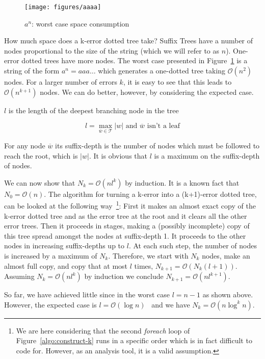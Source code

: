 \begin{figure}
\centering
\texttt{[image: figures/aaaa]}
\caption{$a^n$: worst case space consumption}%
\label{fig:aaaa}
\end{figure}

How much space does a k-error dotted tree take? Suffix Trees have a number of nodes proportional to the size of the string (which we will refer to as $n$). One-error dotted trees have more nodes. The worst case presented in Figure~\ref{fig:aaaa} is a string of the form $a^n = aaa\dots$ which generates a one-dotted tree taking $\mathcal{O}(n^2)$ nodes. For a larger number of errors $k$, it is easy to see that this leads to $\mathcal{O}(n^{k+1})$ nodes. We can do better, however, by considering the expected case.

\begin{definition}
$l$ is the length of the deepest branching node in the tree

\[ l = \max_{\overline{w} \in \mathcal{T}} |w| \mbox{ and $\overline{w}$ isn't a leaf} \]
\end{definition}

\begin{definition}
For any node $\overline{w}$ its suffix-depth is the number of nodes which must be followed to reach the root, which is $|w|$. It is obvious that $l$ is a maximum on the suffix-depth of nodes.
\end{definition}

We can now show that $N_k = \mathcal{O}(nl^k)$ by induction. It is a known fact that $N_0 = \mathcal{O}(n)$. The algorithm for turning a k-error into a (k+1)-error dotted tree, can be looked at the following way~\footnote{We are here considering that the second \textit{foreach} loop of Figure~\ref{algo:construct-k} runs in a specific order which is in fact difficult to code for. However, as an analysis tool, it is a valid assumption.}: First it makes an almost exact copy of the k-error dotted tree and as the error tree at the root and it clears all the other error trees. Then it proceeds in stages, making a (possibly incomplete) copy of this tree spread amongst the nodes at suffix-depth 1. It proceeds to the other nodes in increasing suffix-depths up to $l$. At each such step, the number of nodes is increased by a maximum of $N_k$. Therefore, we start with $N_k$ nodes, make an almost full copy, and copy that at most $l$ times, $N_{k+1}=\mathcal{O}(N_k(l+1))$. Assuming $N_k=\mathcal{O}(nl^k)$ by induction we conclude $N_{k+1}=\mathcal{O}(nl^{k+1})$.

So far, we have achieved little since in the worst case $l=n-1$ as shown above. However, the expected case is $l=\mathcal{O}(\log n)$~\cite{apostolico92selfalignments,szpankowski:unexpected} and we have $N_k=\mathcal{O}(n\log^k n)$.
